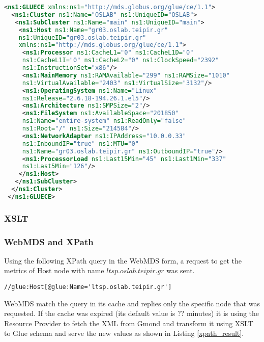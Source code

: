 \begin{lstlisting}[language=XML,caption=WSRF query output]
 <ns1:GLUECE xmlns:ns1="http://mds.globus.org/glue/ce/1.1">
  <ns1:Cluster ns1:Name="OSLAB" ns1:UniqueID="OSLAB">
   <ns1:SubCluster ns1:Name="main" ns1:UniqueID="main">
    <ns1:Host ns1:Name="gr03.oslab.teipir.gr" 
    ns1:UniqueID="gr03.oslab.teipir.gr" 
    xmlns:ns1="http://mds.globus.org/glue/ce/1.1">
     <ns1:Processor ns1:CacheL1="0" ns1:CacheL1D="0" 
     ns1:CacheL1I="0" ns1:CacheL2="0" ns1:ClockSpeed="2392" 
     ns1:InstructionSet="x86"/>
     <ns1:MainMemory ns1:RAMAvailable="299" ns1:RAMSize="1010" 
     ns1:VirtualAvailable="2403" ns1:VirtualSize="3132"/>
     <ns1:OperatingSystem ns1:Name="Linux"
     ns1:Release="2.6.18-194.26.1.el5"/>
     <ns1:Architecture ns1:SMPSize="2"/>
     <ns1:FileSystem ns1:AvailableSpace="201850" 
     ns1:Name="entire-system" ns1:ReadOnly="false"
     ns1:Root="/" ns1:Size="214584"/>
     <ns1:NetworkAdapter ns1:IPAddress="10.0.0.33" 
     ns1:InboundIP="true" ns1:MTU="0" 
     ns1:Name="gr03.oslab.teipir.gr" ns1:OutboundIP="true"/>
     <ns1:ProcessorLoad ns1:Last15Min="45" ns1:Last1Min="337"
     ns1:Last5Min="126"/>
    </ns1:Host>
   </ns1:SubCluster>
  </ns1:Cluster>
 </ns1:GLUECE>
\end{lstlisting}

\subsubsection{XSLT}

\subsubsection{WebMDS and XPath}

Using the following XPath query in the WebMDS form, a request to get the metrics of Host node with name $ltsp.oslab.teipir.gr$ was sent.

\begin{verbatim}
//glue:Host[@glue:Name='ltsp.oslab.teipir.gr']
\end{verbatim}

WebMDS match the query in its cache and replies only the specific node that was requested. If the cache was expired (its default value is ?? minutes) it is using the Resource Provider to fetch the XML from Gmond and transform it using XSLT to Glue schema and serve the new values as shown in Listing \ref{xpath_result}.

